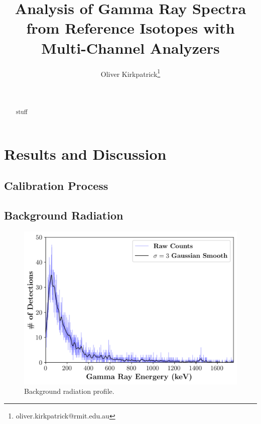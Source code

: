 \documentclass[a4paper,twocolumn]{IEEEtran}
\author{Oliver Kirkpatrick\footnote{oliver.kirkpatrick@rmit.edu.au}}
\begin{document}
    \title{Analysis of Gamma Ray Spectra from Reference Isotopes with Multi-Channel Analyzers}
    \author{
    \\
    }

    \maketitle
    \begin{abstract}
        stuff
    \end{abstract}
    \section{Results and Discussion}
    \subsection{Calibration Process}
    \subsection{Background Radiation}
    \begin{figure}[H]
        \centering
        \includegraphics[width=0.95\linewidth]{figures/background_counts_overlay.png}
        \caption{Background radiation profile.}
    \end{figure}
\end{document}
